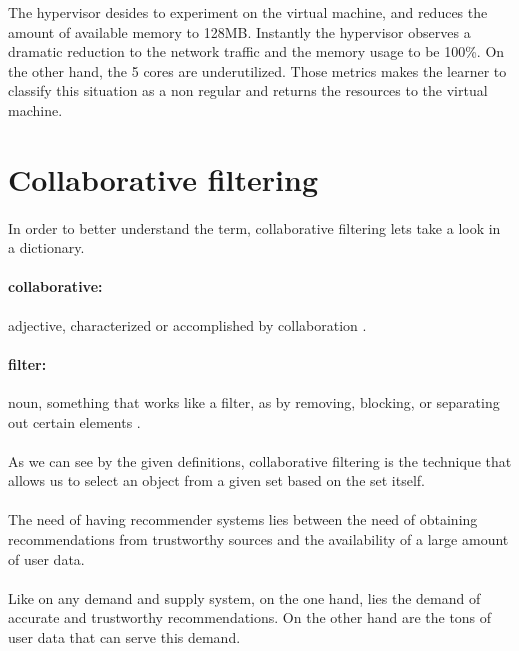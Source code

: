 \begin{description}
	The hypervisor desides to experiment on the virtual machine, and reduces the amount of available memory to 128MB. Instantly the hypervisor observes a dramatic reduction to the network traffic and the memory usage to be 100\%. On the other hand, the 5 cores are underutilized. Those metrics makes the learner to classify this situation as a non regular and returns the resources to the virtual machine.
	
\end{description}

\section{Collaborative filtering}
\paragraph{} In order to better understand the term, collaborative filtering lets take a look in a dictionary.
\paragraph{collaborative:} adjective, characterized or accomplished by collaboration \cite{Dictionary.com2017}.
\paragraph{filter:} noun, something that works like a filter, as by removing, blocking, or separating out certain elements \cite{Dictionary.com2017}.
\paragraph{} As we can see by the given definitions, collaborative filtering is the technique that allows us to select an object from a given set based on the set itself.
\paragraph{}The need of having recommender systems lies between the need of obtaining recommendations from trustworthy sources and the availability of a large amount of user data.
\paragraph{}Like on any demand and supply system, on the one hand, lies the demand of accurate and trustworthy recommendations. On the other hand are the tons of user data that can serve this demand.
